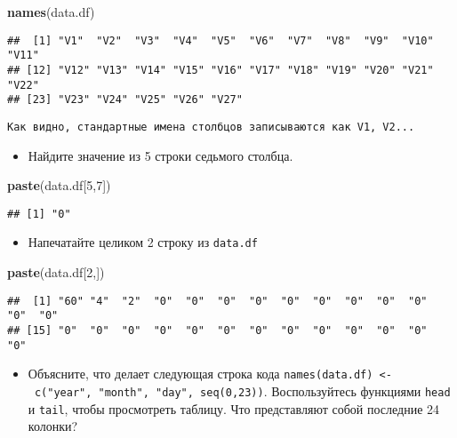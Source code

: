 \documentclass[]{article}
\newenvironment{Shaded}{\begin{snugshade}}{\end{snugshade}}
\newcommand{\KeywordTok}[1]{\textcolor[rgb]{0.13,0.29,0.53}{\textbf{#1}}}
\newcommand{\DecValTok}[1]{\textcolor[rgb]{0.00,0.00,0.81}{#1}}
\newcommand{\NormalTok}[1]{#1}
\providecommand{\tightlist}{%
  \setlength{\itemsep}{0pt}\setlength{\parskip}{0pt}}
\begin{document}
\begin{Shaded}
\begin{Highlighting}[]
\KeywordTok{names}\NormalTok{(data.df)}
\end{Highlighting}
\end{Shaded}

\begin{verbatim}
##  [1] "V1"  "V2"  "V3"  "V4"  "V5"  "V6"  "V7"  "V8"  "V9"  "V10" "V11"
## [12] "V12" "V13" "V14" "V15" "V16" "V17" "V18" "V19" "V20" "V21" "V22"
## [23] "V23" "V24" "V25" "V26" "V27"
\end{verbatim}

\begin{verbatim}
Как видно, стандартные имена столбцов записываются как V1, V2...
\end{verbatim}

\begin{itemize}
\tightlist
\item
  Найдите значение из 5 строки седьмого столбца.
\end{itemize}

\begin{Shaded}
\begin{Highlighting}[]
\KeywordTok{paste}\NormalTok{(data.df[}\DecValTok{5}\NormalTok{,}\DecValTok{7}\NormalTok{])}
\end{Highlighting}
\end{Shaded}

\begin{verbatim}
## [1] "0"
\end{verbatim}

\begin{itemize}
\tightlist
\item
  Напечатайте целиком 2 строку из \texttt{data.df}
\end{itemize}

\begin{Shaded}
\begin{Highlighting}[]
\KeywordTok{paste}\NormalTok{(data.df[}\DecValTok{2}\NormalTok{,])}
\end{Highlighting}
\end{Shaded}

\begin{verbatim}
##  [1] "60" "4"  "2"  "0"  "0"  "0"  "0"  "0"  "0"  "0"  "0"  "0"  "0"  "0" 
## [15] "0"  "0"  "0"  "0"  "0"  "0"  "0"  "0"  "0"  "0"  "0"  "0"  "0"
\end{verbatim}

\begin{itemize}
\tightlist
\item
  Объясните, что делает следующая строка кода
  \texttt{names(data.df)\ \textless{}-\ c("year",\ "month",\ "day",\ seq(0,23))}.
  Воспользуйтесь функциями \texttt{head} и \texttt{tail}, чтобы
  просмотреть таблицу. Что представляют собой последние 24 колонки?
\end{itemize}
\end{document}
